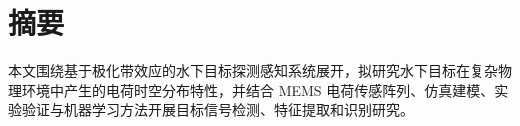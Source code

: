 \chapter*{\texorpdfstring{摘\quad 要}{摘要}}
本文围绕基于极化带效应的水下目标探测感知系统展开，拟研究水下目标在复杂物理环境中产生的电荷时空分布特性，并结合 MEMS 电荷传感阵列、仿真建模、实验验证与机器学习方法开展目标信号检测、特征提取和识别研究。

\clearpage
